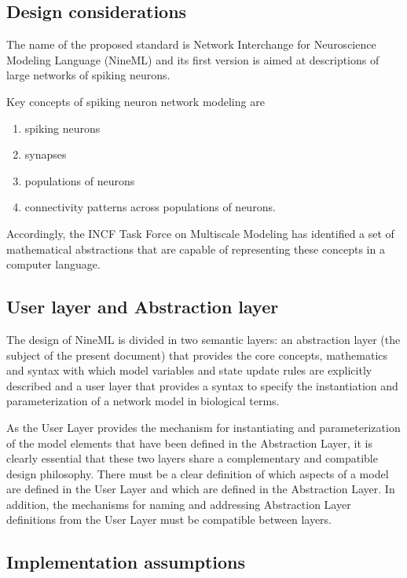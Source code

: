 \documentclass[a4paper]{article}
\begin{document}
\subsection{Design considerations}

The name of the proposed standard is Network
Interchange for Neuroscience Modeling Language (NineML) and its first
version is aimed at descriptions of large networks of spiking neurons.

Key concepts of spiking neuron network modeling are

\begin{enumerate}
\item spiking neurons
\item synapses 
\item populations of neurons 
\item connectivity patterns across populations of neurons. 
\end{enumerate}

Accordingly, the INCF Task Force on Multiscale Modeling has identified
a set of mathematical abstractions that are capable of representing
these concepts in a computer language.  

\subsection{User layer and Abstraction layer}

The design of NineML is divided in two semantic layers: an abstraction
layer (the subject of the present document) that provides the core
concepts, mathematics and syntax with which model variables and state
update rules are explicitly described and a user layer that provides a
syntax to specify the instantiation and parameterization of a network
model in biological terms.

As the User Layer provides the mechanism for instantiating and
parameterization of the model elements that have been defined in the
Abstraction Layer, it is clearly essential that these two layers share
a complementary and compatible design philosophy. There must be a
clear definition of which aspects of a model are defined in the User
Layer and which are defined in the Abstraction Layer. In addition, the
mechanisms for naming and addressing Abstraction Layer definitions
from the User Layer must be compatible between layers.


 
\subsection{Implementation assumptions}
\end{document}
